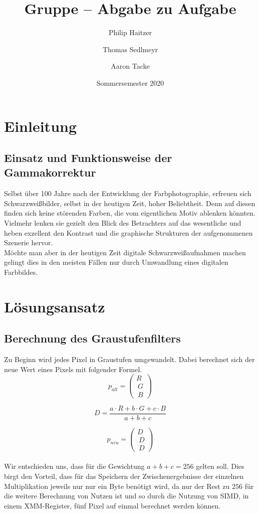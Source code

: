\documentclass[course=erap]{aspdoc}
\author{Philip Haitzer \and Thomas Sedlmeyr \and Aaron Tacke}
\date{Sommersemester 2020} %
\title{Gruppe \theGroup{} -- Abgabe zu Aufgabe \theNumber}
\begin{document}
\maketitle

\section{Einleitung}
\subsection{Einsatz und Funktionsweise der Gammakorrektur}
Selbst über 100 Jahre nach der Entwicklung der Farbphotographie, erfreuen sich Schwarzweißbilder, selbst in der heutigen Zeit, hoher Beliebtheit. Denn auf diesen finden sich keine störenden Farben, die vom eigentlichen Motiv ablenken könnten. Vielmehr lenken sie gezielt den Blick des Betrachters auf das wesentliche und heben exzellent den Kontrast und die graphische Strukturen der aufgenommenen Szenerie hervor. 
\\
\newline
Möchte man aber in der heutigen Zeit digitale Schwarzweißaufnahmen machen gelingt dies in den meisten Fällen nur durch Umwandlung eines digitalen Farbbildes.   


\section{Lösungsansatz}
\subsection{Berechnung des Graustufenfilters}
Zu Beginn wird jedes Pixel in Graustufen umgewandelt. Dabei berechnet sich der neue Wert eines Pixels mit folgender Formel.
\begin{equation}
p_{alt} =  \begin{pmatrix}R \\\ G \\\ B \end{pmatrix}
\end{equation}

\begin{equation}
D = \frac{a \cdot R  + b \cdot G  + c \cdot B }{a + b + c}
\end{equation}   

\begin{equation}
p_{neu} =  \begin{pmatrix}D \\\ D \\\ D \end{pmatrix}
\end{equation}	
\\
Wir entschieden uns, dass für die Gewichtung $a + b + c = 256$ gelten soll. Dies birgt den Vorteil, dass für das Speichern der Zwischenergebnisse der einzelnen Multiplikation jeweils nur nur ein Byte benötigt wird, da nur der Rest zu $256$ für die weitere Berechnung von Nutzen ist und so durch die Nutzung von SIMD, in einem XMM-Register, fünf Pixel auf einmal berechnet werden können.    
\end{document}
